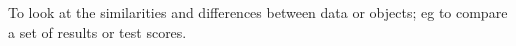 To look at the similarities and differences between data or objects;
eg to compare a set of results or test scores.

